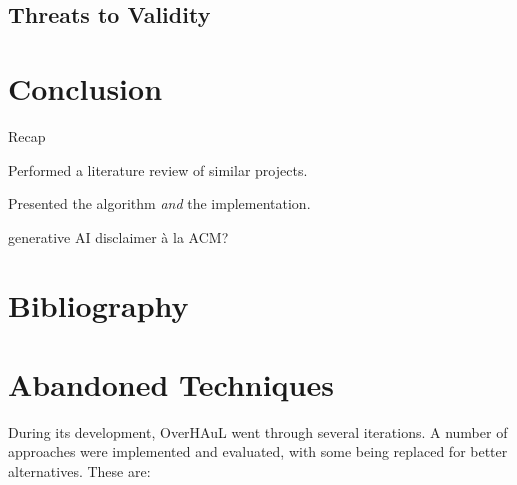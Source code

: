 \documentclass[
  a4paper,
  DIV=11,
  numbers=noendperiod]{scrreprt}
\theoremstyle{definition}
\theoremstyle{remark}
\begin{document}
\section{Threats to Validity}\label{threats-to-validity}


\chapter{Conclusion}\label{conclusion}

Recap

Performed a literature review of similar projects.

Presented the algorithm \emph{and} the implementation.

generative AI disclaimer à la ACM?


\chapter*{Bibliography}\label{bibliography}


\printbibliography[heading=none]

\cleardoublepage
{}
{}
\appendix

\chapter{Abandoned Techniques}\label{sec-abandoned}

During its development, OverHAuL went through several iterations. A
number of approaches were implemented and evaluated, with some being
replaced for better alternatives. These are:
\end{document}
